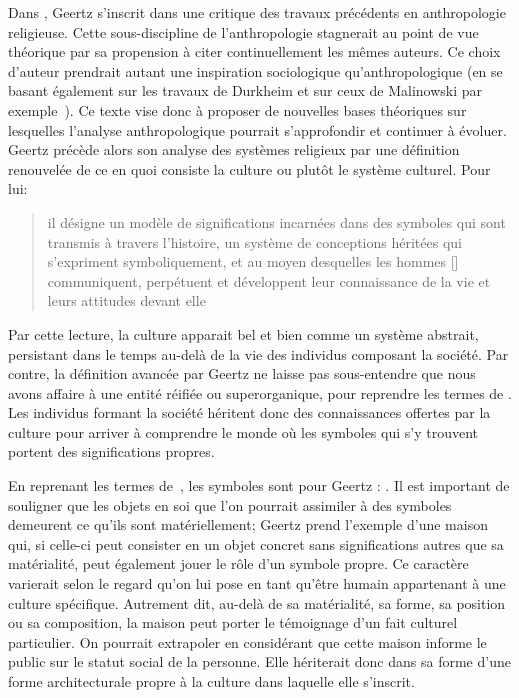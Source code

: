 Dans , Geertz s'inscrit dans une critique des travaux précédents en anthropologie religieuse.
Cette sous-discipline de l'anthropologie stagnerait au point de vue théorique par sa propension à citer continuellement les mêmes auteurs.
Ce choix d'auteur prendrait autant une inspiration sociologique qu'anthropologique (en se basant également sur les travaux de Durkheim et sur ceux de Malinowski par exemple~\citep[20]{Geertz1972}).
Ce texte vise donc à proposer de nouvelles bases théoriques sur lesquelles l'analyse anthropologique pourrait s'approfondir et continuer à évoluer.
Geertz précède alors son analyse des systèmes religieux par une définition renouvelée de ce en quoi consiste la culture ou plutôt le système culturel.
Pour lui: \blockquote[{\cite[21]{Geertz1972}}][.]{\textelp{} il désigne un modèle de significations incarnées dans des symboles qui sont transmis à travers l'histoire, un système de conceptions héritées qui s'expriment symboliquement, et au moyen desquelles les hommes [] communiquent, perpétuent et développent leur connaissance de la vie et leurs attitudes devant elle}.

Par cette lecture, la culture apparait bel et bien comme un système abstrait, persistant dans le temps au-delà de la vie des individus composant la société.
Par contre, la définition avancée par Geertz ne laisse pas sous-entendre que nous avons affaire à une entité réifiée ou superorganique, pour reprendre les termes de \citet{Duncan1980}.
Les individus formant la société héritent donc des connaissances offertes par la culture pour arriver à comprendre le monde où les symboles qui s'y trouvent portent des significations propres.

En reprenant les termes de~\cite{Langer1962}, les symboles sont pour Geertz : .
Il est important de souligner que les objets en soi que l'on pourrait assimiler à des symboles demeurent ce qu'ils sont matériellement; Geertz prend l'exemple d'une maison qui, si celle-ci peut consister en un objet concret sans significations autres que sa matérialité, peut également jouer le rôle d'un symbole propre.
Ce caractère varierait selon le regard qu'on lui pose en tant qu'être humain appartenant à une culture spécifique.
Autrement dit, au-delà de sa matérialité, sa forme, sa position ou sa composition, la maison peut porter le témoignage d'un fait culturel particulier.
On pourrait extrapoler en considérant que cette maison informe le public sur le statut social de la personne.
 Elle hériterait donc dans sa forme d'une forme architecturale propre à la culture dans laquelle elle s'inscrit.

